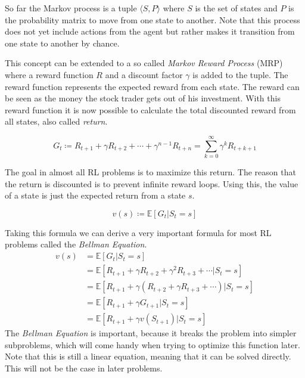 So far the Markov process is a tuple $\langle S, P \rangle$ where $S$ is the set of states and $P$ is the probability matrix to move from one state to another.
Note that this process does not yet include actions from the agent but rather makes it transition from one state to another by chance.


This concept can be extended to a so called \emph{Markov Reward Process} (MRP) where a reward function $R$ and a discount factor $\gamma$ is added to the tuple.
The reward function represents the expected reward from each state.
The reward can be seen as the money the stock trader gets out of his investment.
With this reward function it is now possible to calculate the total discounted reward from all states, also called \emph{return}.
\begin{defn}[Return]
	\begin{equation} \label{eq:return}
		G_{t} \coloneqq R_{t+1} + \gamma R_{t+2} + \dotsb + \gamma ^{n-1} R_{t+n} = \sum_{k=0}^{\infty} \gamma ^k R_{t+k+1}
	\end{equation}
\end{defn}
The goal in almost all RL problems is to maximize this return.
The reason that the return is discounted is to prevent infinite reward loops.
Using this, the value of a state is just the expected return from a state $s$.
\begin{defn}
\begin{equation} \label{eq:value_function}
	v(s) \coloneqq \mathbb{E}[G_{t} | S_{t} = s]
\end{equation}
\end{defn}

Taking this formula we can derive a very important formula for most RL problems called the \emph{Bellman Equation}.
\begin{align}
	\label{eq:bellman}
	v(s) &= \mathbb{E}[G_{t} | S_{t} = s] \nonumber\\
  		&= \mathbb{E}[R_{t+1} + \gamma R_{t+2} + \gamma ^2 R_{t+3} + \dotsb | S_{t} = s] \nonumber\\
  		&= \mathbb{E}[R_{t+1} + \gamma (R_{t+2} + \gamma R_{t+3} + \dotsb) | S_{t} = s] \nonumber\\
			&= \mathbb{E}[R_{t+1} + \gamma G_{t+1} | S_{t} = s] \nonumber\\
			&= \mathbb{E}[R_{t+1} + \gamma v(S_{t+1}) | S_{t} = s]
\end{align}
The \emph{Bellman Equation} is important, because it breaks the problem into simpler subproblems, which will come handy when trying to optimize this function later.
Note that this is still a linear equation, meaning that it can be solved directly. This will not be the case in later problems.


